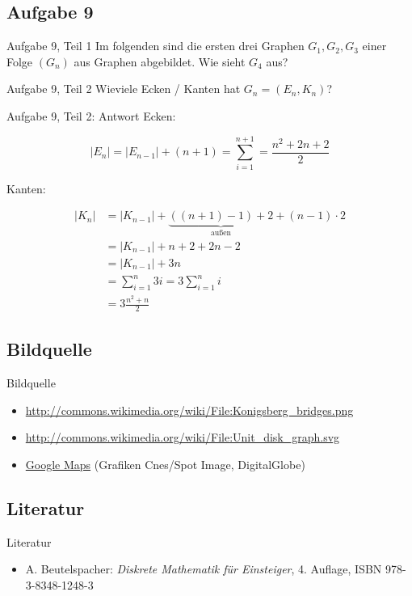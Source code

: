 \subsection{Aufgabe 9}
\begin{frame}{Aufgabe 9, Teil 1}
Im folgenden sind die ersten drei Graphen $G_1, G_2, G_3$ einer
Folge $(G_n)$ aus Graphen abgebildet. Wie sieht $G_4$ aus?

\begin{gallery}
\end{gallery}
\end{frame}

\begin{frame}{Aufgabe 9, Teil 2}
Wieviele Ecken / Kanten hat $G_n = (E_n, K_n)$?
\end{frame}

\begin{frame}{Aufgabe 9, Teil 2: Antwort}
Ecken:

\[|E_n| = |E_{n-1}| + (n+1) = \sum_{i=1}^{n+1} = \frac{n^2 + 2n+2}{2}\]

Kanten:

\begin{align}
|K_n| &= |K_{n-1}| + \underbrace{((n+1)-1)+2}_{\text{außen}} + (n-1) \cdot 2\\
    &= |K_{n-1}| + n+2+2n-2\\
    &= |K_{n-1}| + 3n\\
    &= \sum_{i=1}^{n} 3i = 3 \sum_{i=1}^{n} i \\
    &= 3 \frac{n^2 + n}{2}
\end{align}
\end{frame}



\subsection{Bildquelle}
\begin{frame}{Bildquelle}
\begin{itemize}
    \item \href{http://commons.wikimedia.org/wiki/File:Konigsberg\_bridges.png}{http://commons.wikimedia.org/wiki/File:Konigsberg\_bridges.png}
    \item \href{http://commons.wikimedia.org/wiki/File:Unit\_disk\_graph.svg}{http://commons.wikimedia.org/wiki/File:Unit\_disk\_graph.svg}
    \item \href{http://goo.gl/maps/WnXRh}{Google Maps} (Grafiken  Cnes/Spot Image, DigitalGlobe)
\end{itemize}
\end{frame}

\subsection{Literatur}
\begin{frame}{Literatur}
\begin{itemize}
    \item A. Beutelspacher: \textit{Diskrete Mathematik für Einsteiger}, 4. Auflage, ISBN 978-3-8348-1248-3
\end{itemize}
\end{frame}
